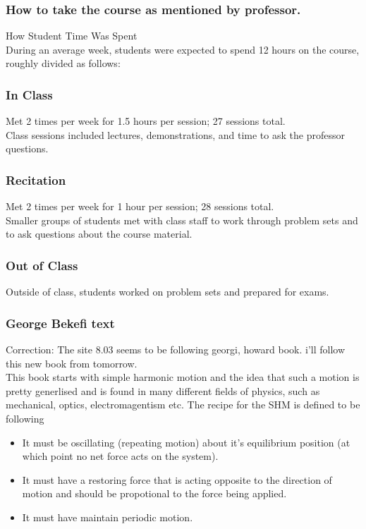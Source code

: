 \documentclass[12pt]{article}
\begin{document}
\subsubsection*{How to take the course as mentioned by professor.}
How Student Time Was Spent\\
During an average week, students were expected to spend 12 hours on the course, roughly divided as follows:
\subsubsection*{In Class}
Met 2 times per week for 1.5 hours per session; 27 sessions total.\\
Class sessions included lectures, demonstrations, and time to ask the professor questions.\\
\subsubsection*{Recitation}
Met 2 times per week for 1 hour per session; 28 sessions total.\\
Smaller groups of students met with class staff to work through problem sets and to ask questions about the course material.\\
\subsubsection*{Out of Class}
Outside of class, students worked on problem sets and prepared for exams.\\

\subsubsection*{George Bekefi text}
Correction: The site 8.03 seems to be following georgi, howard book. i'll follow this new book from tomorrow. \\

This book starts with simple harmonic motion and the idea that such a motion is pretty generlised
and is found in many different fields of physics, such as mechanical, optics, electromagentism etc.
The recipe for the SHM is defined to be following
\begin{itemize}
    \item It must be oscillating (repeating motion) about it's equilibrium position (at which point no net force acts on the system).
    \item It must have a restoring force that is acting opposite to the direction of motion and should be propotional to the force being applied.
    \item It must have maintain periodic motion.
\end{itemize}
\end{document}
